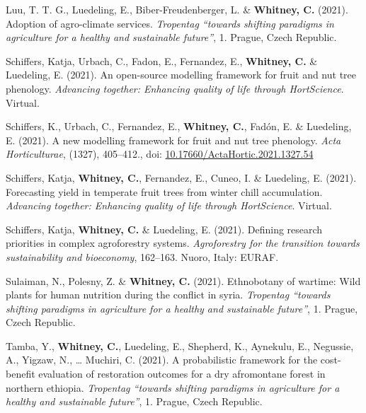 \documentclass[11pt,a4paper,]{awesome-cv}
\newlength{\cslhangindent}
\newenvironment{CSLReferences}[2] %
 {\begin{list}{}{%
  \setlength{\itemindent}{0pt}
  \setlength{\leftmargin}{0pt}
  \setlength{\parsep}{0pt}
  \ifodd #1
   \setlength{\leftmargin}{\cslhangindent}
   \setlength{\itemindent}{-1\cslhangindent}
  \fi
  \setlength{\itemsep}{#2\baselineskip}}}
 {\end{list}}
\begin{document}
\begin{CSLReferences}{1}{0}
Luu, T. T. G., Luedeling, E., Biber-Freudenberger, L. \&
\textbf{Whitney, C.} (2021). Adoption of agro-climate services.
\emph{Tropentag {``towards shifting paradigms in agriculture for a
healthy and sustainable future''}}, 1. Prague, Czech Republic.

Schiffers, Katja, Urbach, C., Fadon, E., Fernandez, E.,
\textbf{Whitney, C.} \& Luedeling, E. (2021). An open-source modelling
framework for fruit and nut tree phenology. \emph{Advancing together:
Enhancing quality of life through HortScience}. Virtual.

Schiffers, K., Urbach, C., Fernandez, E., \textbf{Whitney, C.}, Fadón,
E. \& Luedeling, E. (2021). A new modelling framework for fruit and nut
tree phenology. \emph{Acta Horticulturae}, (1327), 405--412., doi:
\href{https://doi.org/10.17660/ActaHortic.2021.1327.54}{10.17660/ActaHortic.2021.1327.54}

Schiffers, Katja, \textbf{Whitney, C.}, Fernandez, E., Cuneo, I. \&
Luedeling, E. (2021). Forecasting yield in temperate fruit trees from
winter chill accumulation. \emph{Advancing together: Enhancing quality
of life through HortScience}. Virtual.

Schiffers, Katja, \textbf{Whitney, C.} \& Luedeling, E. (2021). Defining
research priorities in complex agroforestry systems. \emph{Agroforestry
for the transition towards sustainability and bioeconomy}, 162--163.
Nuoro, Italy: EURAF.

Sulaiman, N., Polesny, Z. \& \textbf{Whitney, C.} (2021). Ethnobotany of
wartime: Wild plants for human nutrition during the conflict in syria.
\emph{Tropentag {``towards shifting paradigms in agriculture for a
healthy and sustainable future''}}, 1. Prague, Czech Republic.

Tamba, Y., \textbf{Whitney, C.}, Luedeling, E., Shepherd, K., Aynekulu,
E., Negussie, A., Yigzaw, N., \ldots{} Muchiri, C. (2021). A
probabilistic framework for the cost-benefit evaluation of restoration
outcomes for a dry afromontane forest in northern ethiopia.
\emph{Tropentag {``towards shifting paradigms in agriculture for a
healthy and sustainable future''}}, 1. Prague, Czech Republic.


\end{CSLReferences}
\end{document}
